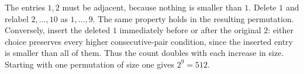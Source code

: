 The entries $1,2$ must be adjacent, because nothing is smaller than $1$. Delete $1$ and relabel $2,\ldots,10$ as $1,\ldots,9$. The same property holds in the resulting permutation. Conversely, insert the deleted $1$ immediately before or after the original $2$: either choice preserves every higher consecutive-pair condition, since the inserted entry is smaller than all of them. Thus the count doubles with each increase in size. Starting with one permutation of size one gives $2^9=\boxed{512}$.
